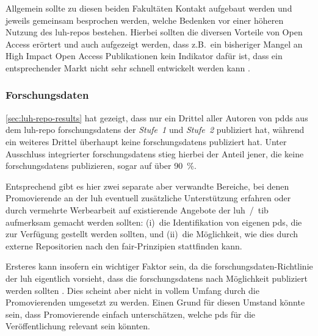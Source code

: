 Allgemein sollte zu diesen beiden Fakultäten Kontakt aufgebaut werden und jeweils gemeinsam besprochen werden, welche Bedenken vor einer höheren Nutzung des \gls{luh-repo}s bestehen.
Hierbei sollten die diversen Vorteile von Open Access erörtert \autocite{Bautista-Puig2020} und auch aufgezeigt werden, dass z.B.~ein bisheriger Mangel an High Impact Open Access Publikationen kein Indikator dafür ist, dass ein entsprechender Markt nicht sehr schnell entwickelt werden kann \autocite{Björk2012}.

\subsubsection{Forschungsdaten}
\cref{sec:luh-repo-results} hat gezeigt, dass nur ein Drittel aller Autoren von \glspl{pdd} aus dem \gls{luh-repo} \glspl{forschungsdaten} der \textit{Stufe~1} und \textit{Stufe~2} publiziert hat, während ein weiteres Drittel überhaupt keine \glspl{forschungsdaten} publiziert hat.
Unter Ausschluss integrierter \glspl{forschungsdaten} stieg hierbei der Anteil jener, die keine \glspl{forschungsdaten} publizieren, sogar auf über \SI{90}{\percent}.

Entsprechend gibt es hier zwei separate aber verwandte Bereiche, bei denen Promovierende an der \gls{luh} eventuell zusätzliche Unterstützung erfahren oder durch vermehrte Werbearbeit auf existierende Angebote der \gls{luh}~/~\gls{tib} aufmerksam gemacht werden sollten:
(i)~die Identifikation von eigenen \glspl{pd}, die zur Verfügung gestellt werden sollten, und (ii)~die Möglichkeit, wie dies durch externe Repositorien nach den \gls{fair}-Prinzipien stattfinden kann.

Ersteres kann insofern ein wichtiger Faktor sein, da die \gls{forschungsdaten}-Richtlinie der \gls{luh} eigentlich vorsieht, dass die \glspl{forschungsdaten} nach Möglichkeit publiziert werden sollten \autocite{luhfdm-richtlinie}.
Dies scheint aber nicht in vollem Umfang durch die Promovierenden umgesetzt zu werden.
Einen Grund für diesen Umstand könnte sein, dass Promovierende einfach unterschätzen, welche \glspl{pd} für die Veröffentlichung relevant sein könnten.

